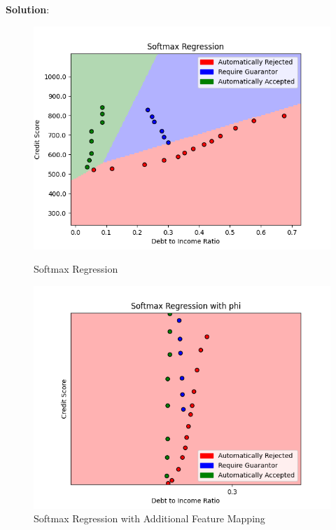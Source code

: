 \documentclass[submit]{../harvardml}
\newenvironment{solution}{
    \vspace{2mm}
    \color{blue}\noindent\textbf{Solution}:
}{}
\begin{document}
\begin{solution}
\begin{tcolorbox}[colback=white,breakable]
  \begin{figure}[H]
      \centering
      \begin{minipage}[b]{0.48\textwidth}
          \includegraphics[width=\textwidth]{img_output/Softmax Regression.png}
          \caption{Softmax Regression}
      \end{minipage}
      \hfill
      \begin{minipage}[b]{0.48\textwidth}
          \includegraphics[width=\textwidth]{img_output/Softmax Regression with phi.png}
          \caption{Softmax Regression with Additional Feature Mapping}
      \end{minipage}
  \end{figure}
  

\end{tcolorbox}
\end{solution}
\end{document}
